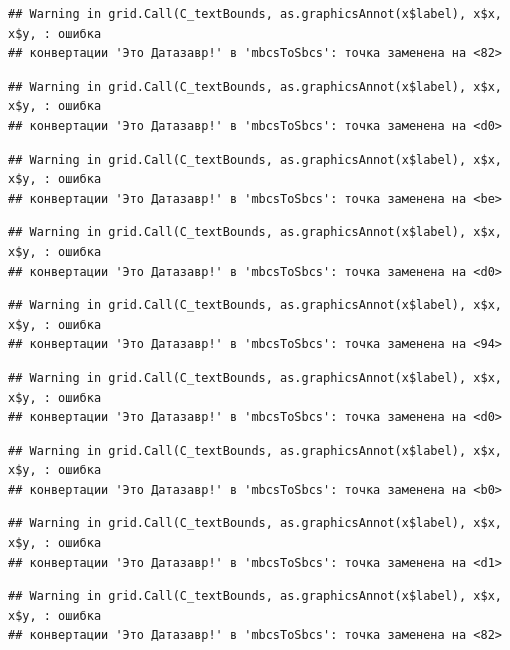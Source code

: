 \documentclass[]{book}
\begin{document}
\begin{verbatim}
## Warning in grid.Call(C_textBounds, as.graphicsAnnot(x$label), x$x, x$y, : ошибка
## конвертации 'Это Датазавр!' в 'mbcsToSbcs': точка заменена на <82>
\end{verbatim}

\begin{verbatim}
## Warning in grid.Call(C_textBounds, as.graphicsAnnot(x$label), x$x, x$y, : ошибка
## конвертации 'Это Датазавр!' в 'mbcsToSbcs': точка заменена на <d0>
\end{verbatim}

\begin{verbatim}
## Warning in grid.Call(C_textBounds, as.graphicsAnnot(x$label), x$x, x$y, : ошибка
## конвертации 'Это Датазавр!' в 'mbcsToSbcs': точка заменена на <be>
\end{verbatim}

\begin{verbatim}
## Warning in grid.Call(C_textBounds, as.graphicsAnnot(x$label), x$x, x$y, : ошибка
## конвертации 'Это Датазавр!' в 'mbcsToSbcs': точка заменена на <d0>
\end{verbatim}

\begin{verbatim}
## Warning in grid.Call(C_textBounds, as.graphicsAnnot(x$label), x$x, x$y, : ошибка
## конвертации 'Это Датазавр!' в 'mbcsToSbcs': точка заменена на <94>
\end{verbatim}

\begin{verbatim}
## Warning in grid.Call(C_textBounds, as.graphicsAnnot(x$label), x$x, x$y, : ошибка
## конвертации 'Это Датазавр!' в 'mbcsToSbcs': точка заменена на <d0>
\end{verbatim}

\begin{verbatim}
## Warning in grid.Call(C_textBounds, as.graphicsAnnot(x$label), x$x, x$y, : ошибка
## конвертации 'Это Датазавр!' в 'mbcsToSbcs': точка заменена на <b0>
\end{verbatim}

\begin{verbatim}
## Warning in grid.Call(C_textBounds, as.graphicsAnnot(x$label), x$x, x$y, : ошибка
## конвертации 'Это Датазавр!' в 'mbcsToSbcs': точка заменена на <d1>
\end{verbatim}

\begin{verbatim}
## Warning in grid.Call(C_textBounds, as.graphicsAnnot(x$label), x$x, x$y, : ошибка
## конвертации 'Это Датазавр!' в 'mbcsToSbcs': точка заменена на <82>
\end{verbatim}
\end{document}
